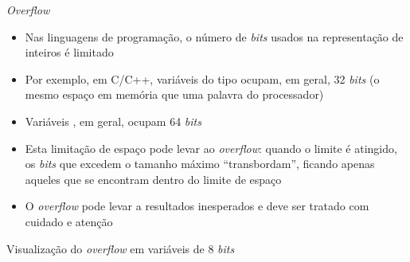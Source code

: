 \begin{frame}[fragile]{\it Overflow}

    \begin{itemize}
        \item Nas linguagens de programação, o número de \textit{bits} usados na representação de inteiros é limitado

        \item Por exemplo, em C/C++, variáveis do tipo   ocupam, em geral, 32 \textit{bits} (o mesmo espaço em memória que uma palavra do processador)

        \item Variáveis , em geral, ocupam 64 \textit{bits}

        \item Esta limitação de espaço pode levar ao \textit{overflow}: quando o limite é atingido, os \textit{bits} que excedem o tamanho máximo ``transbordam'', ficando apenas aqueles que se encontram dentro do limite de espaço

        \item O \textit{overflow} pode levar a resultados inesperados e deve ser tratado com cuidado e atenção
    \end{itemize}

\end{frame}

\begin{frame}[fragile]{Visualização do {\it overflow} em variáveis de 8 {\it bits}}

    \begin{figure}
        \centering


    \end{figure}

\end{frame}


